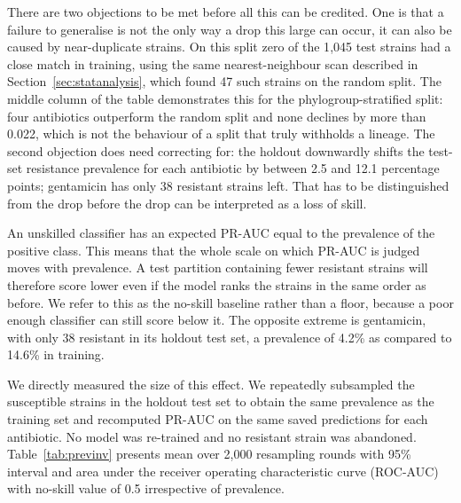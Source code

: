 \documentclass[journal]{IEEEtran}
\begin{document}
There are two objections to be met before all this can be credited. One is that a
failure to generalise is not the only way a drop this large can occur, it can also be
caused by near-duplicate strains. On this split zero of the 1{,}045 test strains had
a close match in training, using the same nearest-neighbour scan described in
Section~\ref{sec:statanalysis}, which found 47 such strains on the random split. The
middle column of the table demonstrates this for the phylogroup-stratified split:
four antibiotics outperform the random split and none declines by more than 0.022,
which is not the behaviour of a split that truly withholds a lineage. The second
objection does need correcting for: the holdout downwardly shifts the test-set
resistance prevalence for each antibiotic by between 2.5 and 12.1 percentage points;
gentamicin has only 38 resistant strains left. That has to be distinguished from the
drop before the drop can be interpreted as a loss of skill.

An unskilled classifier has an expected PR-AUC equal to the prevalence of the
positive class. This means that the whole scale on which PR-AUC is judged moves with
prevalence. A test partition containing fewer resistant strains will therefore score
lower even if the model ranks the strains in the same order as before. We refer to
this as the no-skill baseline rather than a floor, because a poor enough classifier
can still score below it. The opposite extreme is gentamicin, with only 38 resistant
in its holdout test set, a prevalence of 4.2\% as compared to 14.6\% in
training.

We directly measured the size of this effect. We repeatedly subsampled the
susceptible strains in the holdout test set to obtain the same prevalence as the
training set and recomputed PR-AUC on the same saved predictions for each antibiotic.
No model was re-trained and no resistant strain was abandoned.
Table~\ref{tab:previnv} presents mean over 2{,}000 resampling rounds with 95\%
interval and area under the receiver operating characteristic curve (ROC-AUC) with
no-skill value of 0.5 irrespective of prevalence.
\end{document}
